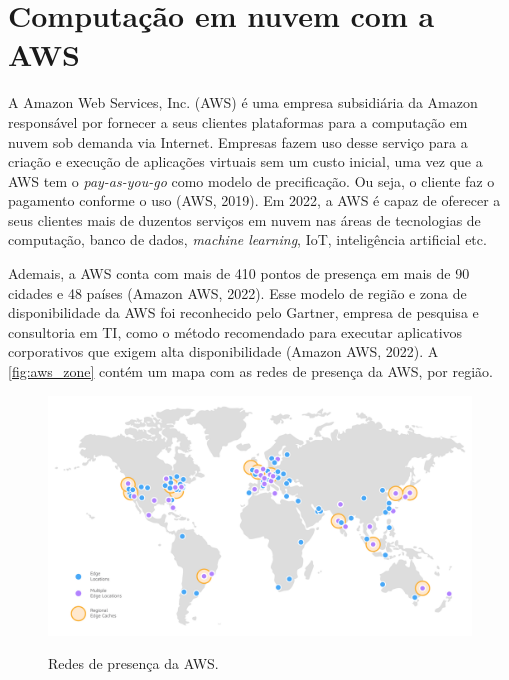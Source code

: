 \section{Computação em nuvem com a AWS}

A Amazon Web Services, Inc. (AWS) é uma empresa subsidiária da Amazon responsável por fornecer a seus clientes plataformas para a computação em nuvem sob demanda via Internet. Empresas fazem uso desse serviço para a criação e execução de aplicações virtuais sem um custo inicial, uma vez que a AWS tem o \textit{pay-as-you-go} como modelo de precificação. Ou seja, o cliente faz o pagamento conforme o uso (AWS, 2019). Em 2022, a AWS é capaz de oferecer a seus clientes mais de duzentos serviços em nuvem nas áreas de tecnologias de computação, banco de dados, \textit{machine learning}, IoT, inteligência artificial etc.

Ademais, a AWS conta com mais de 410 pontos de presença em mais de 90 cidades e 48 países (Amazon AWS, 2022). Esse modelo de região e zona de disponibilidade da AWS foi reconhecido pelo Gartner, empresa de pesquisa e consultoria em TI, como o método recomendado para executar aplicativos corporativos que exigem alta disponibilidade (Amazon AWS, 2022). A \autoref{fig:aws_zone} contém um mapa com as redes de presença da AWS, por região.

\begin{figure}[htbp]
	\centering
	\caption{Redes de presença da AWS.}
	\includegraphics[scale=0.3]{Imagens/aws_zones.png}
	\label{fig:aws_zone}
\end{figure}

